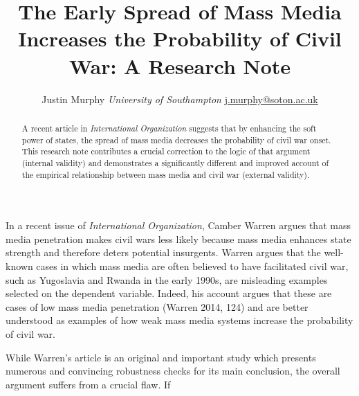 \documentclass[11pt,article,oneside]{memoir}
\title{The Early Spread of Mass Media Increases the Probability of Civil War: A
Research Note}
\author{\Large Justin Murphy\vspace{0.05in} \newline\normalsize\emph{University of Southampton} \newline\footnotesize \url{j.murphy@soton.ac.uk}\vspace*{0.2in}\newline }
\date{}
\begin{document}
  
\setsansfont[Mapping=tex-text]{Gill Sans} 
\setmonofont[Mapping=tex-text,Scale=0.8]{Consolas}

\doublespacing


\maketitle



\vspace{-4ex}
\begin{abstract}

\noindent A recent article in \emph{International Organization} suggests that by
enhancing the soft power of states, the spread of mass media decreases
the probability of civil war onset. This research note contributes a
crucial correction to the logic of that argument (internal validity) and
demonstrates a significantly different and improved account of the
empirical relationship between mass media and civil war (external
validity).

\end{abstract}

\newpage


In a recent issue of \emph{International Organization}, Camber Warren
argues that mass media penetration makes civil wars less likely because
mass media enhances state strength and therefore deters potential
insurgents. Warren argues that the well-known cases in which mass media
are often believed to have facilitated civil war, such as Yugoslavia and
Rwanda in the early 1990s, are misleading examples selected on the
dependent variable. Indeed, his account argues that these are cases of
low mass media penetration (Warren 2014, 124) and are better understood
as examples of how weak mass media systems increase the probability of
civil war.

While Warren's article is an original and important study which presents
numerous and convincing robustness checks for its main conclusion, the
overall argument suffers from a crucial flaw. If
\end{document}
